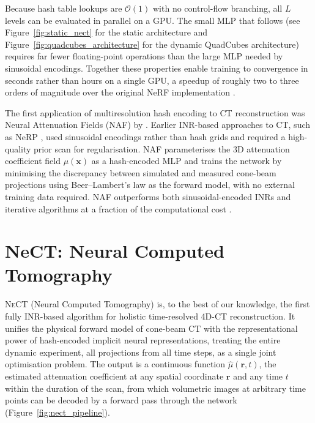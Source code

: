 \documentclass[12pt, a4paper, twoside]{report}
\newcommand{\muhat}{\hat{\mu}}
\newcommand{\NeCT}{\textsc{NeCT}}
\begin{document}
Because hash table lookups are $\mathcal{O}(1)$ with no control-flow branching, all $L$ levels can be evaluated in parallel on a GPU. The small MLP that follows (see Figure~\ref{fig:static_nect} for the static architecture and Figure~\ref{fig:quadcubes_architecture} for the dynamic QuadCubes architecture) requires far fewer floating-point operations than the large MLP needed by sinusoidal encodings. Together these properties enable training to convergence in seconds rather than hours on a single GPU, a speedup of roughly two to three orders of magnitude over the original NeRF implementation \citep{mueller2022instant}.

The first application of multiresolution hash encoding to CT reconstruction was Neural Attenuation Fields (NAF) by \citet{zha2022naf}. Earlier INR-based approaches to CT, such as NeRP \citep{shen2022nerp}, used sinusoidal encodings rather than hash grids and required a high-quality prior scan for regularisation. NAF parameterises the 3D attenuation coefficient field $\mu(\mathbf{x})$ as a hash-encoded MLP and trains the network by minimising the discrepancy between simulated and measured cone-beam projections using Beer--Lambert's law as the forward model, with no external training data required. NAF outperforms both sinusoidal-encoded INRs and iterative algorithms at a fraction of the computational cost \citep{zha2022naf}.

\section{NeCT: Neural Computed Tomography}
\label{sec:nect}

\NeCT{} (Neural Computed Tomography) \citep{friis2025nect} is, to the best of our knowledge, the first fully INR-based algorithm for holistic time-resolved 4D-CT reconstruction. It unifies the physical forward model of cone-beam CT with the representational power of hash-encoded implicit neural representations, treating the entire dynamic experiment, all projections from all time steps, as a single joint optimisation problem. The output is a continuous function $\muhat(\mathbf{r}, t)$, the estimated attenuation coefficient at any spatial coordinate $\mathbf{r}$ and any time $t$ within the duration of the scan, from which volumetric images at arbitrary time points can be decoded by a forward pass through the network (Figure~\ref{fig:nect_pipeline}).
\end{document}
